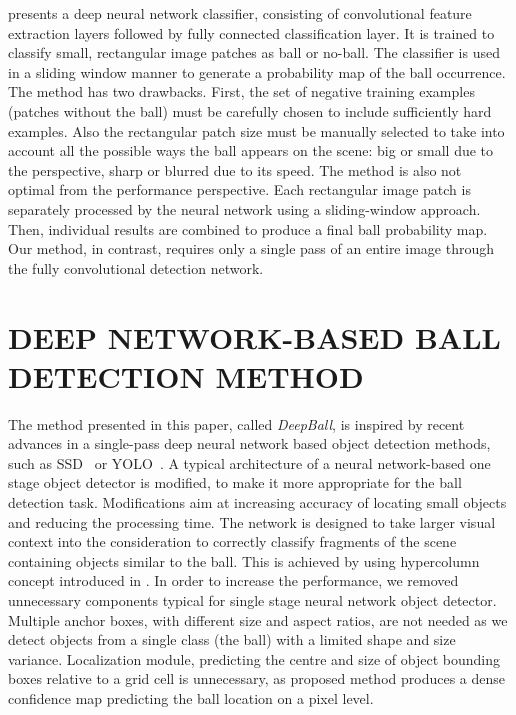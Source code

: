 \documentclass[a4paper,twoside]{article}
\begin{document}
\cite{Reno18} presents a deep neural network classifier, consisting of convolutional feature extraction layers followed by fully connected classification layer. It is trained to classify small, rectangular image patches as ball or no-ball.
The classifier is used in a sliding window manner to generate a probability map of the ball occurrence. The method has two drawbacks. 
First, the set of negative training examples (patches without the ball) must be carefully chosen to include sufficiently hard examples. 
Also the rectangular patch size must be manually selected to take into account all the possible ways the ball appears on the scene: big or small due to the perspective, sharp or blurred due to its speed. The method is also not optimal from the performance perspective.
Each rectangular image patch is separately processed by the neural network using a sliding-window approach. Then, individual results are combined to produce a final ball probability map.
Our method, in contrast, requires only a single pass of an entire image through the fully convolutional detection network. 









\section{\uppercase{Deep network-based ball detection method}}

The method presented in this paper, called \emph{DeepBall}, is inspired by recent advances in a single-pass deep neural network based object detection methods, such as SSD~\cite{Liu16} or YOLO~\cite{Redm16}.
A typical architecture of a neural network-based one stage object detector is modified, to make it more appropriate for the ball detection task. Modifications aim at increasing accuracy of locating small objects and reducing the processing time. The network is designed to take larger visual context into the consideration to correctly classify fragments of the scene containing objects similar to the ball. This is achieved by using hypercolumn concept introduced in \cite{Hari15}. 
In order to increase the performance, we removed unnecessary components typical for single stage neural network object detector.
Multiple anchor boxes, with different size and aspect ratios, are not needed as we detect objects from a single class (the ball) with a limited shape and size variance.
Localization module, predicting the centre and size of object bounding boxes relative to a grid cell is unnecessary, as proposed method produces a dense confidence map predicting the ball location on a pixel level. 
\end{document}

